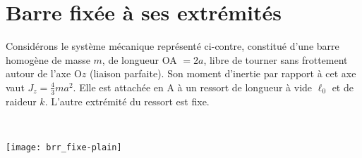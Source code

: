 \documentclass[a4paper, 10pt, final, garamond]{book}
\begin{document}
\section{Barre fixée à ses extrémités}
\noindent
\begin{minipage}[c]{.70\linewidth}
	Considérons le système mécanique représenté ci-contre, constitué d'une barre
	homogène de masse $m$, de longueur OA $= 2a$, libre de tourner sans frottement
	autour de l'axe O$z$ (liaison parfaite). Son moment d'inertie par rapport à
	cet axe vaut $J_z = \frac{4}{3}ma^2$. Elle est attachée en A à un ressort de
	longueur à vide $\ell_0$ et de raideur $k$. L'autre extrémité du ressort est
	fixe.
\end{minipage}
\hfill
\begin{minipage}[c]{.25\linewidth}
	~
	\begin{center}
		\texttt{[image: brr\_fixe-plain]}
	\end{center}
\end{minipage}
\end{document}
